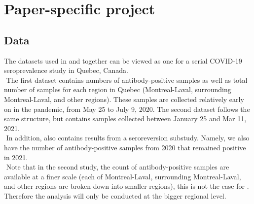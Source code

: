 \section{Paper-specific project}

\subsection{Data}
The datasets used in \cite{lewin2021sars} and \cite{lewin2022seroprevalence} together can be viewed as one for a serial COVID-19 seroprevalence study in Quebec, Canada. \\
\newline $ $
The first dataset contains numbers of antibody-positive samples as well as total number of samples for each region in Quebec (Montreal-Laval, surrounding Montreal-Laval, and other regions). These samples are collected relatively early on in the pandemic, from May 25 to July 9, 2020. The second dataset follows the same structure, but contains samples collected between January 25 and Mar 11, 2021. \\
\newline $ $
In addition, \cite{lewin2022seroprevalence} also contains results from a seroreversion substudy. Namely, we also have the number of antibody-positive samples from 2020 that remained positive in 2021. \\
\newline $ $
Note that in the second study, the count of antibody-positive samples are available at a finer scale (each of Montreal-Laval, surrounding Montreal-Laval, and other regions are broken down into smaller regions), this is not the case for \cite{lewin2021sars}. Therefore the analysis will only be conducted at the bigger regional level.

